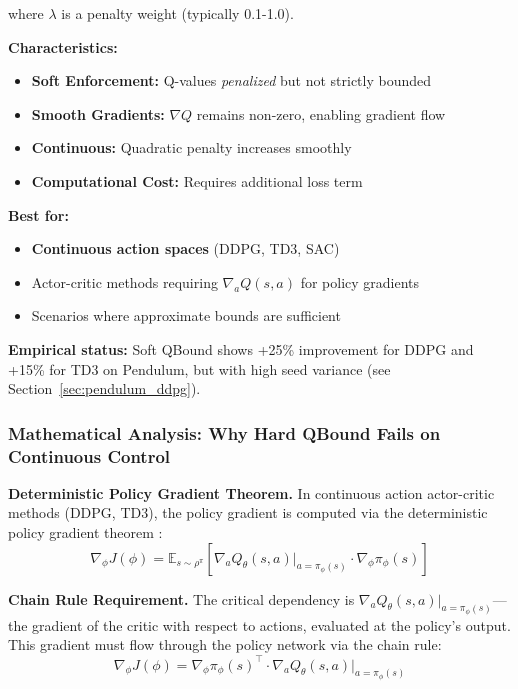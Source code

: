 \documentclass[11pt]{article}
\theoremstyle{definition}
\theoremstyle{remark}
\newcommand{\E}{\mathbb{E}}
\begin{document}
where $\lambda$ is a penalty weight (typically 0.1-1.0).

\textbf{Characteristics:}
\begin{itemize}
    \item \textbf{Soft Enforcement:} Q-values \textit{penalized} but not strictly bounded
    \item \textbf{Smooth Gradients:} $\nabla Q$ remains non-zero, enabling gradient flow
    \item \textbf{Continuous:} Quadratic penalty increases smoothly
    \item \textbf{Computational Cost:} Requires additional loss term
\end{itemize}

\textbf{Best for:}
\begin{itemize}
    \item \textbf{Continuous action spaces} (DDPG, TD3, SAC)
    \item Actor-critic methods requiring $\nabla_a Q(s,a)$ for policy gradients
    \item Scenarios where approximate bounds are sufficient
\end{itemize}

\textbf{Empirical status:} Soft QBound shows +25\% improvement for DDPG and +15\% for TD3 on Pendulum, but with high seed variance (see Section~\ref{sec:pendulum_ddpg}).

\subsubsection{Mathematical Analysis: Why Hard QBound Fails on Continuous Control}

\textbf{Deterministic Policy Gradient Theorem.}
In continuous action actor-critic methods (DDPG, TD3), the policy gradient is computed via the deterministic policy gradient theorem \citep{silver2014deterministic}:
\begin{equation}
\nabla_\phi J(\phi) = \E_{s \sim \rho^\pi} \left[ \nabla_a Q_\theta(s,a) \Big|_{a=\pi_\phi(s)} \cdot \nabla_\phi \pi_\phi(s) \right]
\end{equation}

\textbf{Chain Rule Requirement.}
The critical dependency is $\nabla_a Q_\theta(s,a)|_{a=\pi_\phi(s)}$—the gradient of the critic with respect to actions, evaluated at the policy's output. This gradient must flow through the policy network via the chain rule:
\begin{equation}
\nabla_\phi J(\phi) = \nabla_\phi \pi_\phi(s)^\top \cdot \nabla_a Q_\theta(s,a) \Big|_{a=\pi_\phi(s)}
\end{equation}
\end{document}
